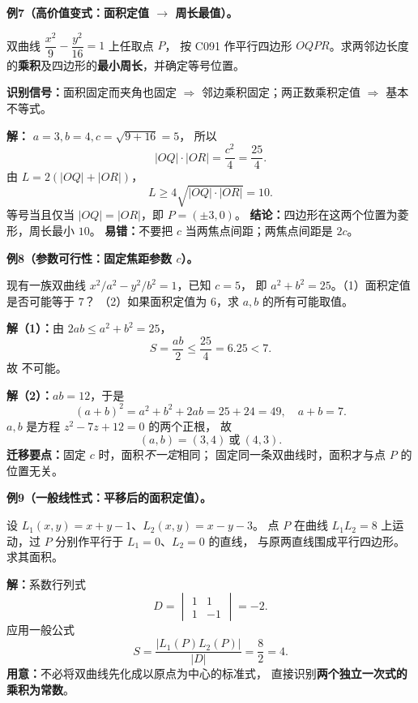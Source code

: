 \clearpage
\begin{examplebox}
\textbf{例7（高价值变式：面积定值 $\to$ 周长最值）。}

双曲线 $\dfrac{x^2}{9}-\dfrac{y^2}{16}=1$ 上任取点 $P$，
按 C091 作平行四边形 $OQPR$。求两邻边长度的\textbf{乘积}及四边形的\textbf{最小周长}，并确定等号位置。

\textbf{识别信号：}面积固定而夹角也固定 $\Rightarrow$
邻边乘积固定；两正数乘积定值 $\Rightarrow$ 基本不等式。

\textbf{解：} $a=3,b=4,c=\sqrt{9+16}=5$，
所以
\[
|OQ|\cdot|OR|=\frac{c^2}{4}=\boxed{\frac{25}{4}}.
\]
由 $L=2(|OQ|+|OR|)$，
\[
L\ge4\sqrt{|OQ|\cdot|OR|}=\boxed{10}.
\]
等号当且仅当 $|OQ|=|OR|$，即 $P=(\pm3,0)$。
\textbf{结论：}四边形在这两个位置为菱形，周长最小 $10$。
\textbf{易错：}不要把 $c$ 当两焦点间距；两焦点间距是 $2c$。
\end{examplebox}

\clearpage
\begin{examplebox}
\textbf{例8（参数可行性：固定焦距参数 $c$）。}

现有一族双曲线 $x^2/a^2-y^2/b^2=1$，已知 $c=5$，
即 $a^2+b^2=25$。（1）面积定值是否可能等于 $7$？
（2）如果面积定值为 $6$，求 $a,b$ 的所有可能取值。

\textbf{解（1）：}由 $2ab\le a^2+b^2=25$，
\[
S=\frac{ab}{2}\le\frac{25}{4}=6.25<7.
\]
故 $\boxed{\text{不可能}}$。

\textbf{解（2）：}$ab=12$，于是
\[
(a+b)^2=a^2+b^2+2ab=25+24=49,
\quad a+b=7.
\]
$a,b$ 是方程 $z^2-7z+12=0$ 的两个正根，
故
\[
\boxed{(a,b)=(3,4)\ \text{或}\ (4,3)}.
\]
\textbf{迁移要点：}固定 $c$ 时，面积\emph{不一定}相同；
固定同一条双曲线时，面积才与点 $P$ 的位置无关。
\end{examplebox}

\clearpage
\begin{examplebox}
\textbf{例9（一般线性式：平移后的面积定值）。}

设 $L_1(x,y)=x+y-1$、$L_2(x,y)=x-y-3$。
点 $P$ 在曲线 $L_1L_2=8$ 上运动，过 $P$
分别作平行于 $L_1=0$、$L_2=0$ 的直线，
与原两直线围成平行四边形。求其面积。

\textbf{解：}系数行列式
\[
D=\begin{vmatrix}1&1\\1&-1\end{vmatrix}=-2.
\]
应用一般公式
\[
\boxed{S=\frac{|L_1(P)L_2(P)|}{|D|}=\frac8{2}=4}.
\]
\textbf{用意：}不必将双曲线先化成以原点为中心的标准式，
直接识别\textbf{两个独立一次式的乘积为常数}。
\end{examplebox}
